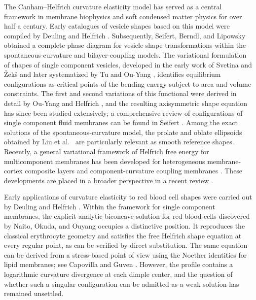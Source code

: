 \documentclass[preprint,amsmath,amssymb,aps,prl,superscriptaddress,nofootinbib,floatfix]{revtex4-2}
\begin{document}
The Canham--Helfrich curvature elasticity model \cite{Canham1970,Helfrich1973} has served as a central framework in membrane biophysics and soft condensed matter physics for over half a century. Early catalogues of vesicle shapes based on this model were compiled by Deuling and Helfrich \cite{Deuling1976a}. Subsequently, Seifert, Berndl, and Lipowsky \cite{Seifert1991} obtained a complete phase diagram for vesicle shape transformations within the spontaneous-curvature and bilayer-coupling models. The variational formulation of shapes of single component vesicles, developed in the early work of Svetina and \v{Z}ek\v{s} \cite{SvetinaZeks1989} and later systematized by Tu and Ou-Yang \cite{TuOuYang2004}, identifies equilibrium configurations as critical points of the bending energy subject to area and volume constraints. The first and second variations of this functional were derived in detail by Ou-Yang and Helfrich \cite{OuYangHelfrich1989}, and the resulting axisymmetric shape equation has since been studied extensively; a comprehensive review of configurations of single component fluid membranes can be found in Seifert \cite{Seifert1997}. Among the exact solutions of the spontaneous-curvature model, the prolate and oblate ellipsoids obtained by Liu et al.\ \cite{Liu1999} are particularly relevant as smooth reference shapes. Recently, a general variational framework of Helfrich free energy for multicomponent membranes has been developed for heterogeneous membrane-cortex composite layers \cite{Wu2018} and component-curvature coupling membranes \cite{Wu2025}. These developments are placed in a broader perspective in a recent review \cite{WuOuYang2026}.

Early applications of curvature elasticity to red blood cell shapes were carried out by Deuling and Helfrich \cite{Deuling1976b}. Within the framework for single component membranes, the explicit analytic biconcave solution for red blood cells discovered by Naito, Okuda, and Ouyang \cite{Naito1993,Naito1996} occupies a distinctive position. It reproduces the classical erythrocyte geometry \cite{Evans1972} and satisfies the free Helfrich shape equation at every regular point, as can be verified by direct substitution. The same equation can be derived from a stress-based point of view using the Noether identities for lipid membranes; see Capovilla and Guven \cite{CapovillaGuven2002}. However, the profile contains a logarithmic curvature divergence at each dimple center, and the question of whether such a singular configuration can be admitted as a weak solution has remained unsettled.
\end{document}
